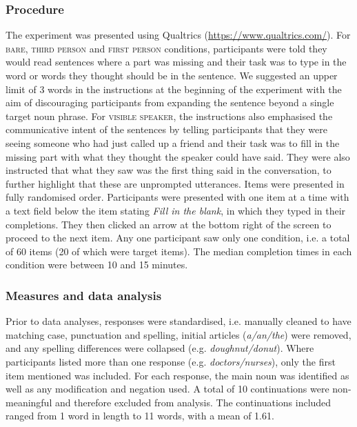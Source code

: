 \documentclass[output=paper,colorlinks,citecolor=brown]{langscibook}
\begin{document}
\subsubsection{Procedure}

The experiment was presented using Qualtrics (\url{https://www.qualtrics.com/}). For \textsc{bare}, \textsc{third person} and \textsc{first person} conditions, participants were told they would read sentences where a part was missing and their task was to type in the word or words they thought should be in the sentence. We suggested an upper limit of 3 words in the instructions at the beginning of the experiment with the aim of discouraging participants from expanding the sentence beyond a single target noun phrase. For \textsc{visible speaker}, the instructions also emphasised the communicative intent of the sentences by telling participants that they were seeing someone who had just called up a friend and their task was to fill in the missing part with what they thought the speaker could have said. They were also instructed that what they saw was the first thing said in the conversation, to further highlight that these are unprompted utterances. Items were presented in fully randomised order. Participants were presented with one item at a time with a text field below the item stating \textit{Fill in the blank}, in which they typed in their completions. They then clicked an arrow at the bottom right of the screen to proceed to the next item. Any one participant saw only one condition, i.e. a total of 60 items (20 of which were target items). The median completion times in each condition were between 10 and 15 minutes.
 
\subsubsection{Measures and data analysis} 

Prior to data analyses, responses were standardised, i.e. manually cleaned to have matching case, punctuation and spelling, initial articles (\textit{a/an/the}) were removed, and any spelling differences were collapsed (e.g. \textit{doughnut/donut}). Where participants listed more than one response (e.g. \textit{doctors/nurses}), only the first item mentioned was included. For each response, the main noun was identified as well as any modification and negation used. A total of 10 continuations were non-meaningful and therefore excluded from analysis. The continuations included ranged from 1 word in length to 11 words, with a mean of 1.61. 
 
\end{document}
